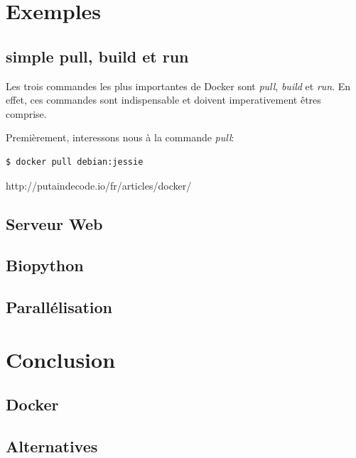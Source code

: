 \section{Exemples}
\subsection{simple pull, build et run}
Les trois commandes les plus importantes de Docker sont \emph{pull}, \emph{build} et \emph{run}. En effet, ces commandes sont indispensable et doivent imperativement êtres comprise.

Premièrement, interessons nous à la commande \emph{pull}:

\begin{lstlisting}[frame=single]
$ docker pull debian:jessie
\end{lstlisting}

http://putaindecode.io/fr/articles/docker/

\subsection{Serveur Web}
\subsection{Biopython}
\subsection{Parallélisation}

\section{Conclusion}
\subsection{Docker}
\subsection{Alternatives}
































